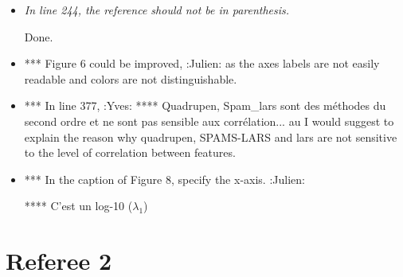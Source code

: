 \documentclass[a4paper,11pt]{texMemo}
\begin{document}
\begin{itemize}
\item 
\emph{In line 244, %
   the reference should not be in parenthesis.}

Done.









\item 
*** Figure 6 could be improved, :Julien:
as the axes labels are not easily readable and colors are not
distinguishable.

\item
*** In line 377,                                                       :Yves:
**** Quadrupen, Spam\_lars sont des méthodes du second ordre et ne sont pas sensible aux corrélation... au 
I would suggest to explain the reason why quadrupen, SPAMS-LARS and lars are not
sensitive to the level of correlation between features.


\item
*** In the caption of Figure 8, specify the x-axis. :Julien: 

**** C'est un log-10 ($\lambda_1$)


\end{itemize}




\section*{Referee 2}


%
\end{document}
